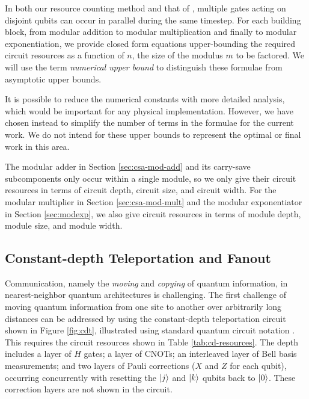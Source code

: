 \documentclass[twoside]{article}
\begin{document}
In both our resource counting method and that of \cite{Fowler2004,Kutin2006}, multiple gates acting on disjoint qubits
can occur in parallel during the same timestep. For each building block,
from modular addition to modular multiplication and finally to modular
exponentiation, we provide closed form equations upper-bounding the required circuit
resources as a function of $n$, the size of the modulus $m$ to be factored.
We will use the
term \emph{numerical upper bound} to distinguish these formulae from asymptotic
upper bounds.

It is possible to reduce the numerical constants with more detailed analysis,
which would be important for any physical implementation.
However, we have chosen instead to simplify the number of terms in the formulae
for the current work. We do not intend for these upper bounds to represent
the optimal or final work in this area.

The modular adder in Section \ref{sec:csa-mod-add} and its carry-save
subcomponents only occur within a single module, so we only give their
circuit resources in terms of circuit depth, circuit size, and circuit width. 
For the modular multiplier in
Section \ref{sec:csa-mod-mult} and the modular exponentiator in
Section \ref{sec:modexp}, we also give circuit resources in
terms of module depth, module size, and module width.

\subsection{Constant-depth Teleportation and Fanout}
\label{subsec:fanout}

Communication, namely the \emph{moving} and \emph{copying} of quantum information, in nearest-neighbor quantum architectures is challenging.
The first challenge of moving quantum information from one site to another over
arbitrarily long distances can be addressed by using
the constant-depth teleportation circuit
shown in Figure \ref{fig:cdt}, illustrated using standard quantum circuit
notation \cite{Nielsen2000}. This requires the circuit resources shown in
Table \ref{tab:cd-resources}. The depth includes a layer of $H$ gates; a layer of CNOTs; an interleaved layer of Bell basis measurements; and two layers of
Pauli corrections ($X$ and $Z$ for each qubit), occurring concurrently with
resetting the $\left\vert{j}\right\rangle$ and $\left\vert{k}\right\rangle$ qubits back to $\left\vert{0}\right\rangle$.
These correction layers are not shown in the circuit.
\end{document}
